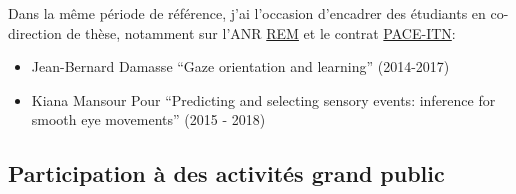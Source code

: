 Dans la même période de référence, j'ai l'occasion d'encadrer des étudiants en co-direction de thèse, notamment sur l'ANR \href{https://laurentperrinet.github.io/project/anr-rem/}{REM} et le contrat \href{https://laurentperrinet.github.io/project/pace-itn/}{PACE-ITN}: %
\begin{itemize}
	\item Jean-Bernard Damasse 	``Gaze orientation and learning'' (2014-2017)
	\item Kiana Mansour Pour 	``Predicting and selecting sensory events: inference for smooth eye movements'' (2015 - 2018)
\end{itemize}

\subsection{Participation à des activités grand public} %

